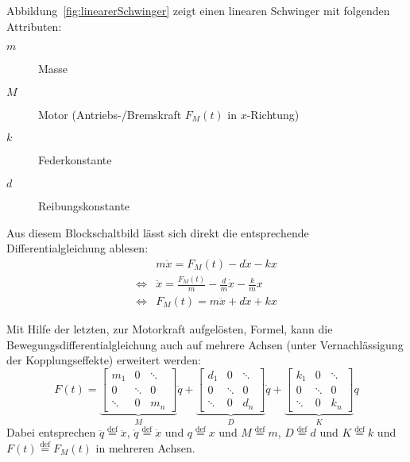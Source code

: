 			Abbildung~\ref{fig:linearerSchwinger} zeigt einen linearen Schwinger mit folgenden Attributen:
			\begin{description}
				\item[\(m\)] Masse
				\item[\(M\)] Motor (Antriebs-/Bremskraft \( F _ M (t) \) in \(x\)-Richtung)
				\item[\(k\)] Federkonstante
				\item[\(d\)] Reibungskonstante
			\end{description}

			Aus diesem Blockschaltbild lässt sich direkt die entsprechende Differentialgleichung ablesen:
			\begin{align*}
				     & m\ddot{x} = F _ M (t) - d\dot{x} - kx \tag{Grundform}                                   \\
				\iff & \ddot{x} = \frac{F _ M (t)}{m} - \frac{d}{m} \dot{x} - \frac{k}{m} x \tag{Normalisiert} \\
				\iff & F _ M (t) = m\ddot{x} + d\dot{x} + kx \tag{Motorkraft}
			\end{align*}

			Mit Hilfe der letzten, zur Motorkraft aufgelösten, Formel, kann die Bewegungsdifferentialgleichung auch auf mehrere Achsen (unter Vernachlässigung der Kopplungseffekte) erweitert werden:
			\begin{equation*}
				F (t) =
				\underbrace{
					\begin{bmatrix}
						m _ 1  & 0      & \ddots \\
						0      & \ddots & 0      \\
						\ddots & 0      & m _ n
					\end{bmatrix}
				} _ { M }
				\ddot{q} +
				\underbrace{
					\begin{bmatrix}
						d _ 1  & 0      & \ddots \\
						0      & \ddots & 0      \\
						\ddots & 0      & d _ n
					\end{bmatrix}
				} _ { D }
				\dot{q} +
				\underbrace{
					\begin{bmatrix}
						k _ 1  & 0      & \ddots \\
						0      & \ddots & 0      \\
						\ddots & 0      & k _ n
					\end{bmatrix}
				} _ { K }
				q
			\end{equation*}
			Dabei entsprechen \( \ddot{q} \overset{\text{def}}{=} \ddot{x} \), \( \dot{q} \overset{\text{def}}{=} \dot{x} \) und \( q \overset{\text{def}}{=} x \) und \( M \overset{\text{def}}{=} m \), \( D \overset{\text{def}}{=} d \) und \( K \overset{\text{def}}{=} k \) und \( F(t) \overset{\text{def}}{=} F _ M (t) \) in mehreren Achsen.

